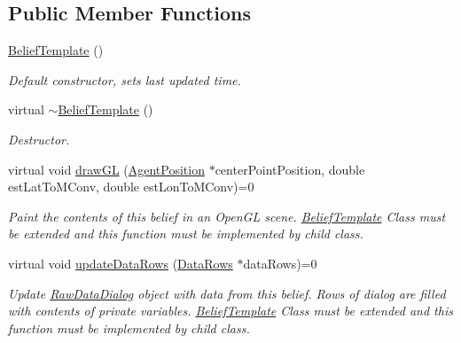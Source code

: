 \subsection*{Public Member Functions}
\begin{DoxyCompactItemize}
\item 
\hypertarget{class_belief_template_af876948ec587cf5d056d06e57d02b414}{
\hyperlink{class_belief_template_af876948ec587cf5d056d06e57d02b414}{BeliefTemplate} ()}
\label{class_belief_template_af876948ec587cf5d056d06e57d02b414}

\begin{DoxyCompactList}\small\item\em Default constructor, sets last updated time. \end{DoxyCompactList}\item 
\hypertarget{class_belief_template_aabcd8cc04ac8a5e7dab0060481461fc8}{
virtual \hyperlink{class_belief_template_aabcd8cc04ac8a5e7dab0060481461fc8}{$\sim$BeliefTemplate} ()}
\label{class_belief_template_aabcd8cc04ac8a5e7dab0060481461fc8}

\begin{DoxyCompactList}\small\item\em Destructor. \end{DoxyCompactList}\item 
virtual void \hyperlink{class_belief_template_a39fa2dbd14a42cf6b67da48375e992f8}{drawGL} (\hyperlink{class_agent_position}{AgentPosition} $\ast$centerPointPosition, double estLatToMConv, double estLonToMConv)=0
\begin{DoxyCompactList}\small\item\em Paint the contents of this belief in an OpenGL scene. \hyperlink{class_belief_template}{BeliefTemplate} Class must be extended and this function must be implemented by child class. \end{DoxyCompactList}\item 
virtual void \hyperlink{class_belief_template_a72e58b1d025012f3f2572a8983e8355c}{updateDataRows} (\hyperlink{struct_data_rows}{DataRows} $\ast$dataRows)=0
\begin{DoxyCompactList}\small\item\em Update \hyperlink{class_raw_data_dialog}{RawDataDialog} object with data from this belief. Rows of dialog are filled with contents of private variables. \hyperlink{class_belief_template}{BeliefTemplate} Class must be extended and this function must be implemented by child class. \end{DoxyCompactList}\end{DoxyCompactItemize}
